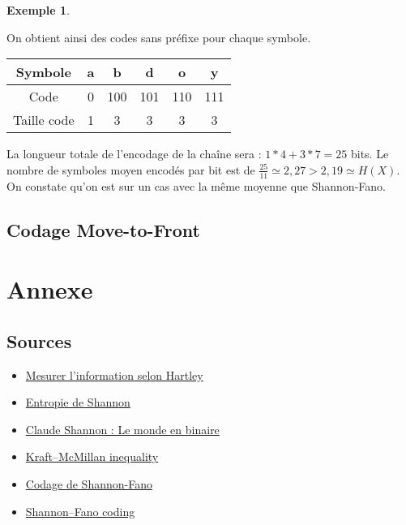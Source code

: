 \documentclass[10pt,a4paper]{article}
\theoremstyle{definition}
\newtheorem{example}{Exemple}
\numberwithin{lemma}{subsection}
\numberwithin{theorem}{subsection}
\numberwithin{definition}{subsection}
\numberwithin{proposition}{subsection}
\numberwithin{corollary}{subsection}
\numberwithin{property}{subsection}
\numberwithin{example}{subsection}
\numberwithin{heuristique}{subsection}
\numberwithin{scenario}{subsection}
\begin{document}
\begin{example}
\begin{itemize}
\begin{center}
\end{center}
\end{itemize}
On obtient ainsi des codes sans préfixe pour chaque symbole.
\par\begin{tabular}{|c|c|c|c|c|c|}
\hline
Symbole & a & b & d & o & y \\
\hline
Code & 0 & 100 & 101 & 110 & 111 \\
\hline
Taille code & 1 & 3 & 3 & 3 & 3 \\
\hline
\end{tabular}
\par La longueur totale de l'encodage de la chaîne sera : $1*4 + 3*7 = 25$ bits. Le nombre de symboles moyen encodés par bit est de $\frac{25}{11} \simeq 2,27 > 2,19 \simeq H(X)$. On constate qu'on est sur un cas avec la même moyenne que Shannon-Fano.
\end{example}

	\subsection{Codage Move-to-Front}
	
        

\section*{Annexe}
\subsection*{Sources}
\begin{itemize}
\item \href{https://www.sciencepresse.qc.ca/blogue/2014/12/24/mesurer-linformation-selon-hartley}{Mesurer l'information selon Hartley}
\item \href{https://fr.wikipedia.org/wiki/Entropie_de_Shannon}{Entropie de Shannon}
\item \href{https://centenaire-shannon.cnrs.fr/chapter/la-theorie-de-information}{Claude Shannon : Le monde en binaire}
\item \href{https://en.wikipedia.org/wiki/Kraft\%E2\%80\%93McMillan_inequality}{Kraft–McMillan inequality}
\item \href{https://fr.wikipedia.org/wiki/Codage_de_Shannon-Fano}{Codage de Shannon-Fano}
\item \href{https://en.wikipedia.org/wiki/Shannon\%E2\%80\%93Fano_coding}{Shannon–Fano coding}
\end{itemize}
\end{document}
